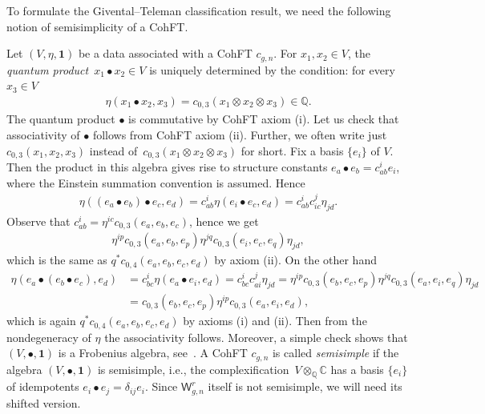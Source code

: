 \documentclass[10pt,a4paper]{amsart}
\def\b1{{\mathbf 1}}
\def\W{\mathsf{W}}
\numberwithin{equation}{section}
\begin{document}
To formulate the Givental--Teleman classification result, we need the following notion of semisimplicity of a CohFT.

Let $(V,\eta,\b1)$ be a data associated with a CohFT $c_{g,n}$.
For $x_1, x_2\in V$, the {\em quantum product}~${x_1 \bullet x_2\in V}$ is uniquely determined by the condition:
for every $x_3\in V$
\begin{align*}
\eta(x_1 \bullet x_2, x_3) = c_{0,3}(x_1 \otimes x_2 \otimes x_3)\in \mathbb{Q} .\end{align*}
The quantum product $\bullet$ is commutative by CohFT axiom (i). Let us check that associativity of $\bullet$ follows from CohFT axiom (ii).
Further, we often write just $c_{0,3}(x_1, x_2, x_3)$ instead of~${c_{0,3}(x_1 \otimes x_2 \otimes x_3)}$ for short.
Fix a basis $\{e_i\}$ of $V$. Then the product in this algebra gives rise to structure constants $e_a \bullet e_b = c^{i}_{ab}e_i$, where the Einstein summation convention is assumed. Hence
\begin{align*}
\eta((e_a\bullet e_b)\bullet e_c,e_d) = c^{i}_{ab} \eta(e_i\bullet e_c, e_d)
=c^{i}_{ab} c^{j}_{ic} \eta_{jd}.
\end{align*}
Observe that $c^{i}_{ab} = \eta^{ic}c_{0,3}(e_a,e_b,e_c)$, hence we get
\begin{align*}
\eta^{ip}c_{0,3}(e_a,e_b,e_p)\eta^{jq}c_{0,3}(e_i,e_c,e_q)\eta_{jd},
\end{align*}
which is the same as $q^{*}c_{0,4}(e_a,e_b,e_c,e_d)$ by axiom (ii). On the other hand
\begin{align*}
\eta(e_a\bullet (e_b\bullet e_c),e_d)& = c^{i}_{bc} \eta(e_a\bullet e_i, e_d)
=c^{i}_{bc} c^{j}_{ai} \eta_{jd}
=\eta^{ip}c_{0,3}(e_b,e_c,e_p)\eta^{jq}c_{0,3}(e_a,e_i,e_q)\eta_{jd} \\
&= c_{0,3}(e_b,e_c,e_p)\eta^{ip}c_{0,3}(e_a,e_i,e_d),
\end{align*}
which is again $q^{*}c_{0,4}(e_a,e_b,e_c,e_d)$ by axioms (i) and (ii). Then from the nondegeneracy of $\eta$ the associativity follows. Moreover, a simple check shows that $(V,\bullet,\b1)$ is a Frobenius algebra, see~\cite{K03}.
A CohFT $c_{g,n}$ is called \emph{semisimple} if the algebra $(V,\bullet,\b1)$ is semisimple, i.e., the complexification~${V \otimes_{\mathbb{Q}} \mathbb{C}}$ has a basis $\{e_i\}$ of idempotents
$e_i\bullet e_j = \delta_{ij}e_i$.
Since $\W^r_{g,n}$ itself is not semisimple, we will need its shifted version.
\end{document}
